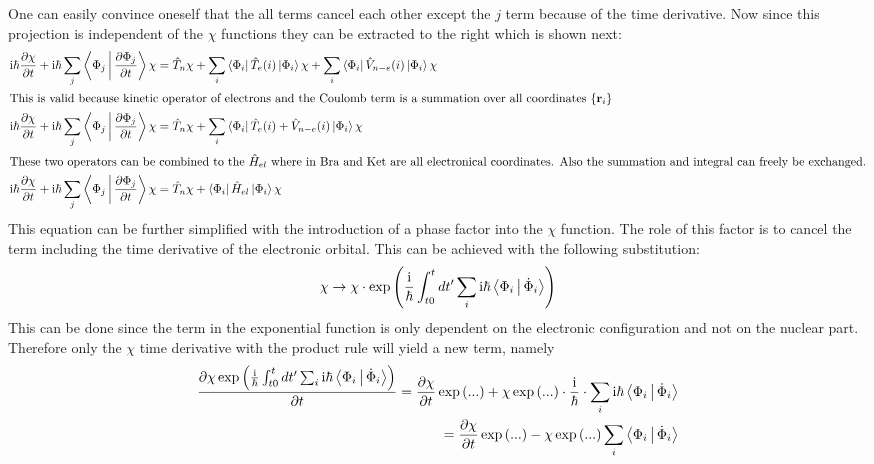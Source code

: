 \documentclass[12pt]{scrartcl}
\begin{document}
One can easily convince oneself that the all terms cancel each other except the $j$ term because of the time derivative. Now since this projection is independent of the $\chi$ functions they can be extracted to the right which is shown next:
\begin{align*}
\mathrm{i}\hbar \frac{\partial \chi}{\partial t} +\mathrm{i}\hbar \sum_{j} \Braket{\Phi_j|\frac{\partial\Phi_j}{\partial t}}\chi &= \hat{T}_n\chi+ \sum_{i} \Bra{\Phi_i} \hat{T}_e(i)\Ket{\Phi_i} \chi + \sum_{i} \Bra{\Phi_i} \hat{V}_{n-e}(i)\Ket{\Phi_i} \chi \\
\intertext{This is valid because kinetic operator of electrons and the Coulomb term is a summation over all coordinates $\{\mathbf{r}_i \}$}
\mathrm{i}\hbar \frac{\partial \chi}{\partial t} + \mathrm{i}\hbar\sum_{j} \Braket{\Phi_j|\frac{\partial\Phi_j}{\partial t}}\chi &= \hat{T}_n\chi+ \sum_{i} \Bra{\Phi_i} \hat{T}_e(i)+\hat{V}_{n-e}(i)\Ket{\Phi_i} \chi\\
\intertext{These two operators can be combined to the $\hat{H}_{el}$ where in Bra and Ket are all electronical coordinates. Also the summation and integral can freely be exchanged.}
\mathrm{i}\hbar \frac{\partial \chi}{\partial t} + \mathrm{i}\hbar\sum_{j} \Braket{\Phi_j|\frac{\partial\Phi_j}{\partial t}}\chi &= \hat{T}_n\chi+  \Bra{\Phi_i} \hat{H}_{el}\Ket{\Phi_i} \chi\\
\end{align*}
This equation can be further simplified with the introduction of a phase factor into the $\chi$ function. The role of this factor is to cancel the term including the time derivative of the electronic orbital. This can be achieved with the following substitution:
\begin{equation}
\chi \rightarrow \chi \cdot \exp\left( \frac{\mathrm{i}}{\hbar} \int_{t0}^{t}dt'\sum_{i}\mathrm{i}\hbar\Braket{\Phi_i|\dot{\Phi}_i} \right)
\label{phasefactorsinglechi}
\end{equation}
This can be done since the term in the exponential function is only dependent on the electronic configuration and not on the nuclear part. Therefore only the $\chi$ time derivative with the product rule will yield a new term, namely
\begin{align*}
\frac{\partial \chi \exp\left( \frac{\mathrm{i}}{\hbar} \int_{t0}^{t}dt'\sum_{i}\mathrm{i}\hbar\Braket{\Phi_i|\dot{\Phi}_i} \right)}{\partial t} = \frac{\partial \chi}{\partial t}\exp\left(...\right) + \chi\exp\left(...\right) \cdot \frac{\mathrm{i}}{\hbar} \cdot \sum_{i}\mathrm{i}\hbar\Braket{\Phi_i|\dot{\Phi}_i}\\
=\frac{\partial \chi}{\partial t}\exp\left(...\right) - \chi\exp\left(...\right) \sum_{i}\Braket{\Phi_i|\dot{\Phi}_i}
\end{align*}
\end{document}
